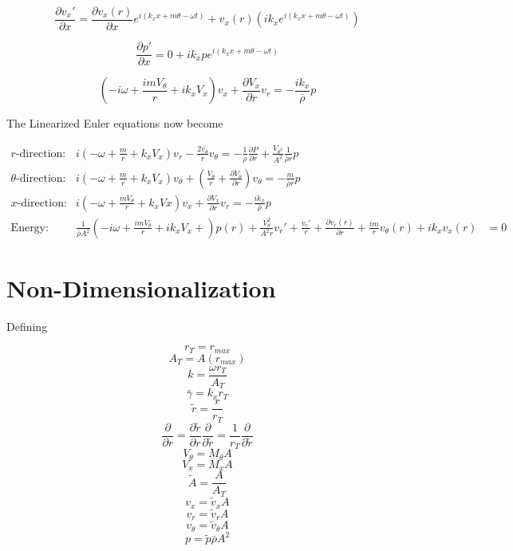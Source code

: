 \documentclass[12pt]{article}
\begin{document}
\[\frac{\partial v_x'}{\partial x} = \frac{\partial v_x(r)}{\partial x} e^{i\left(k_x x + m \theta - \omega t \right)} + 
v_x(r) \left(i k_x e^{i\left(k_x x + m \theta - \omega t \right)}\right)\]

\[\frac{\partial p'}{\partial x} = 0 + ik_xpe^{i\left(k_x x + m \theta - \omega t \right)} \]

\[\left(-i\omega + \frac{imV_{\theta}}{r} + i k_xV_x\right)v_x + \frac{\partial V_x}{\partial r} v_r = - \frac{i
	k_x}{\bar{\rho}}p\]

The Linearized Euler equations now become

\begin{align*}
r\text{-direction: }& i\left(-\omega + \frac{ m}{r} +  k_x V_x \right) v_r - \frac{2 \bar{v_{\theta}}}{r}v_{\theta}  = -\frac{1}{\bar{\rho}} \frac{\partial P}{\partial r}+ \frac{V_{\theta^2}}{A^2}\frac{1}{\bar{\rho} r}p\\
\theta\text{-direction: }& i\left(-\omega + \frac{ m}{r} +  k_x V_x \right) v_{\theta} + \left(\frac{V_{\theta}}{r} +  \frac{\partial V_{\theta}}{\partial r}\right)v_\theta = -\frac{m}{\bar{\rho}r}p \\ 
x\text{-direction: }&i\left(-\omega + \frac{mV_{\theta}}{r} +  k_xVx\right)v_x + \frac{\partial V_x}{\partial r} v_r = - \frac{i
	k_x}{\bar{\rho}}p\\ 
\text{Energy: }&\frac{1}{\bar{\rho} A^2} \left(-i\omega + \frac{imV_{\theta}}{r} + ik_xV_x  +
\right)p(r)  +
\frac{V_{\theta}^2}{A^2 r}v_r'+ \frac{v_r'}{r} +
\frac{\partial v_r(r)}{\partial r}+ 
\frac{im}{r} v_{\theta}(r)
+
ik_xv_x(r) 
&= 0
\end{align*}


\section{Non-Dimensionalization}
Defining 

\[r_T = r_{max}\]
\[A_T = A(r_{max})\]
\[k = \frac{\omega r_T}{A_T}\]
\[\bar{\gamma} = k_x r_T\]
\[\tilde{r} = \frac{r}{r_T}\]
\[\frac{\partial }{\partial r} = \frac{\partial \tilde{r}}{\partial r} \frac{\partial }{\partial \tilde{r}} = \frac{1}{r_T} \frac{\partial }{\partial \tilde{r}}\]
\[V_{\theta} = M_{\theta} A\]
\[V_{x} = M_{x} A\]
\[\tilde{A} = \frac{A}{A_T}\]
\[v_{x} =\tilde{v}_x A\]
\[v_{r} =\tilde{v}_r A\]
\[v_{\theta} =\tilde{v}_{\theta} A\]
\[p = \tilde{p} \bar{\rho} A^2\]
\end{document}
